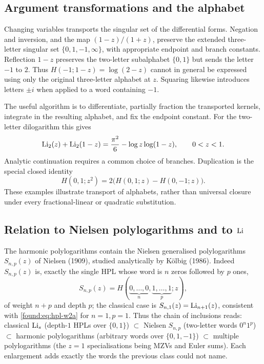 \subsection{Argument transformations and the alphabet}
Changing variables transports the singular set of the differential forms.
Negation and inversion, and the map $(1-z)/(1+z)$, preserve the extended
three-letter singular set $\{0,1,-1,\infty\}$, with appropriate endpoint and
branch constants. Reflection $1-z$ preserves the two-letter subalphabet
$\{0,1\}$ but sends the letter $-1$ to $2$. Thus
$H(-1;1-z)=\log(2-z)$ cannot in general be expressed using only the original
three-letter alphabet at $z$. Squaring likewise introduces letters $\pm i$
when applied to a word containing $-1$.

The useful algorithm is to differentiate, partially fraction the transported
kernels, integrate in the resulting alphabet, and fix the endpoint constant.
For the two-letter dilogarithm this gives
\begin{equation}\label{found:eq:dilog-refl}
\operatorname{Li}_2(z)+\operatorname{Li}_2(1-z)=\frac{\pi^2}{6}-\log z\log(1-z),\qquad 0<z<1.
\end{equation}
Analytic continuation requires a common choice of branches.
Duplication is the special closed identity
\[
H(0,1;z^2)=2\bigl(H(0,1;z)-H(0,-1;z)\bigr).
\]
These examples illustrate transport of alphabets, rather than universal
closure under every fractional-linear or quadratic substitution.

\subsection{Relation to Nielsen polylogarithms and to \texorpdfstring{$\operatorname{Li}$}{Li}}

The harmonic polylogarithms contain the Nielsen generalised polylogarithms $S_{n,p}(z)$ of Nielsen (1909), studied analytically by K\"olbig (1986). Indeed $S_{n,p}(z)$ is, exactly the single HPL whose word is $n$ zeros followed by $p$ ones,
\begin{equation}\label{found:eq:nielsen}
  S_{n,p}(z)=H(\underbrace{0,\dots,0}_{n},\underbrace{1,\dots,1}_{p};z),
\end{equation}
of weight $n+p$ and depth $p$; the classical case is $S_{n,1}(z)=\operatorname{Li}_{n+1}(z)$, consistent with \eqref{found:eq:hpl-w2a} for $n=1,p=1$. Thus the chain of inclusions reads: classical $\operatorname{Li}_s$ (depth-$1$ HPLs over $\{0,1\}$) $\subset$ Nielsen $S_{n,p}$ (two-letter words $0^n1^p$) $\subset$ harmonic polylogarithms (arbitrary words over $\{0,1,-1\}$) $\subset$ multiple polylogarithms (the $z=1$ specialisations being MZVs and Euler sums). Each enlargement adds exactly the words the previous class could not name.

